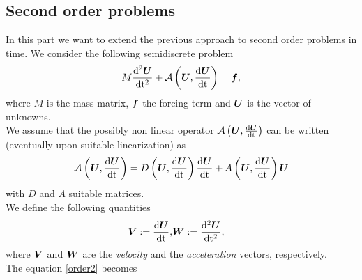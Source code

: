 \documentclass[english,a4paper]{article}
\newcommand{\Ubf}{\text{\mbox{\boldmath $U$}}}
\newcommand{\Abf}{\text{\mbox{\boldmath $W$}}}
\newcommand{\fbf}{\text{\mbox{\boldmath $f$}}}
\newcommand{\Wbf}{\text{\mbox{\boldmath $V$}}}
\begin{document}
\subsection{ Second order problems}
In this part we want to extend the previous approach to   second order
problems in
time.
We consider the following semidiscrete problem
\begin{equation}\label{order2}
M\frac{\rm{d}^2\Ubf}{\rm{d} t^2}+\mathcal{A}\left(\Ubf,\frac{\rm{d}\Ubf}{\rm{d} t}\right)=\fbf,
\end{equation}
where $M$ is the mass matrix, $\fbf$ the forcing term
 and $\Ubf$ is the  vector of unknowns.\\
We assume that the possibly non linear operator
$\mathcal{A}\left(\Ubf,\frac{\rm{d}\Ubf}{\rm{d} t}\right)$ can be written
(eventually upon  suitable linearization) as
$$
\mathcal{A}\left(\Ubf,\frac{\rm{d}\Ubf}{\rm{d} t}\right)=
D\left(\Ubf,\frac{\rm{d}\Ubf}{\rm{d} t}\right)\frac{\rm{d}\Ubf}{\rm{d}
  t}+ A\left(\Ubf,\frac{\rm{d}\Ubf}{\rm{d} t}\right) \Ubf
$$
with $D$ and $A$ suitable  matrices.\\
We define the following quantities
\begin{eqnarray*}
\Wbf:=\frac{\rm{d } \Ubf}{\rm{d } t }, & \displaystyle\Abf:=\frac{\rm{d }^2  \Ubf}{\rm{d } t^2 },
\end{eqnarray*}
where $\Wbf$ and $\Abf$ are the {\sl velocity} and the {\sl acceleration} vectors,
respectively.\\
The equation \eqref{order2} becomes
\end{document}
